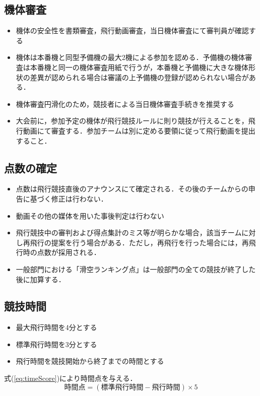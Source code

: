 \documentclass[a4paper,12pt,oneside]{jsarticle}
\begin{document}
\subsection{機体審査}
\begin{itemize}
  \item 機体の安全性を書類審査，飛行動画審査，当日機体審査にて審判員が確認する
  \item 機体は本番機と同型予備機の最大2機による参加を認める．予備機の機体審査は本番機と同一の機体審査用紙で行うが，本番機と予備機に大きな機体形状の差異が認められる場合は審議の上予備機の登録が認められない場合がある．
  \item 機体審査円滑化のため，競技者による当日機体審査手続きを推奨する
  \item 大会前に，参加予定の機体が飛行競技ルールに則り競技が行えることを，飛行動画にて審査する．参加チームは別に定める要領に従って飛行動画を提出すること．
\end{itemize}

\subsection{点数の確定}
\begin{itemize}
  \item 点数は飛行競技直後のアナウンスにて確定される．その後のチームからの申告に基づく修正は行わない．
  \item 動画その他の媒体を用いた事後判定は行わない
  \item 飛行競技中の審判および得点集計のミス等が明らかな場合，該当チームに対し再飛行の提案を行う場合がある．ただし，再飛行を行った場合には，再飛行時の点数が採用される．
  \item 一般部門における「滑空ランキング点」は一般部門の全ての競技が終了した後に加算する．
\end{itemize}

\subsection{競技時間}
\begin{itemize}
  \item 最大飛行時間を4分とする
  \item 標準飛行時間を3分とする
  \item 飛行時間を競技開始から終了までの時間とする
\end{itemize}
式(\ref{eq:timeScore})により時間点を与える．
\begin{equation}\label{eq:timeScore}
  時間点 = (標準飛行時間 - 飛行時間)\times 5
\end{equation}
\end{document}
